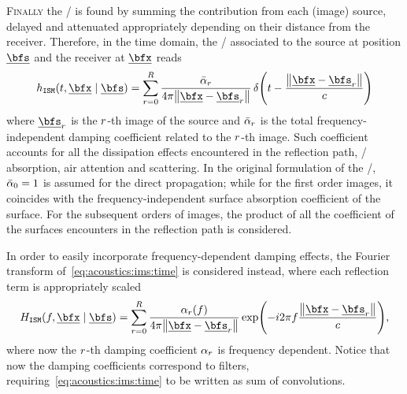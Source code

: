 

\textsc{Finally} the \RIR/ is found by summing the contribution from each (image) source, delayed and attenuated appropriately depending on their distance from the receiver.
Therefore, in the time domain, the \RIR/ associated to the source at position $\positionSource$ and the receiver at $\positionMicrophone$ reads
\begin{equation}\label{eq:acoustics:ims:time}
    \rir_{\mathtt{ISM}}(t, \positionMicrophone \mid \positionSource) =
    \sum_{\idxEch=0}^{\numEchs}
        \frac{\bar{\absCoeff}_{\idxEch}}{4 \pi \norm{\positionMicrophone - \positionSource_\idxEch}}
        \diracOf{t - \frac{\norm{\positionMicrophone - \positionSource_\idxEch}}{\speedOfSound}}
\end{equation}
where $\positionSource_\idxEch$ is the $r$-th image of the source and $\bar{\alpha}_{r}$
is the total frequency-independent damping coefficient related to the $r$-th image.
Such coefficient accounts for all the dissipation effects encountered in the reflection path, \eg/ absorption, air attention and scattering.
In the original formulation of the \ISM/, $\bar{\alpha}_{0} = 1$ is assumed for the direct propagation;
while for the first order images, it coincides with the frequency-independent surface absorption coefficient of the surface.
For the subsequent orders of images, the product of all the coefficient of the surfaces encounters in the reflection path is considered.

\mynewline
In order to easily incorporate frequency-dependent damping effects, the Fourier transform of~\cref{eq:acoustics:ims:time} is considered instead, where
each reflection term is appropriately scaled
\begin{equation}
    \label{eq:acoustics:ims:freq}
    \rirFreq_{\mathtt{ISM}}(f, \positionMicrophone \mid \positionSource) =
        \sum_{\idxEch=0}^{\numEchs} \frac{\absCoeff_{\idxEch}(f)}{4 \pi \norm{\positionMicrophone - \positionSource_\idxEch}}
        \exp\kparen{- \csti 2 \pi f \frac{\norm{\positionMicrophone - \positionSource_\idxEch}}{\speedOfSound}}
        ,
\end{equation}
where now the $r$-th damping coefficient $\alpha_{r}$ is frequency dependent.
Notice that now the damping coefficients correspond to filters, requiring~\cref{eq:acoustics:ims:time} to be written as sum of convolutions.

